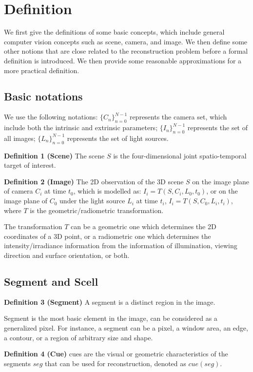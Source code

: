\section{Definition}
\label{sec:3DRecon_Def}
We first give the definitions of some basic concepts, which include general computer vision concepts such as scene, camera, and image. We then define some other notions that are close related to the reconstruction problem before a formal definition is introduced. We then provide some reasonable approximations for a more practical definition.

\subsection{Basic notations}
We use the following notations: $\{C_n\}_{n=0}^{N-1}$ represents the camera set, which include both the intrinsic and extrinsic parameters; $\{I_n\}_{n=0}^{N-1}$ represents the set of all images; $\{L_n\}_{n=0}^{N-1}$ represents the set of light sources.

\textbf{Definition 1 (Scene)} The scene $S$ is the four-dimensional joint spatio-temporal target of interest.

\textbf{Definition 2 (Image)} The 2D observation of the 3D scene $S$ on the image plane of camera $C_i$ at time $t_0$, which is modelled as: $I_i = T(S, C_i, L_0, t_0)$, or on the image plane of $C_0$  under the light source $L_i$ at time $t_i$, $I_i= T(S, C_0, L_i, t_i)$, where $T$ is the geometric/radiometric transformation.

The transformation $T$ can be a geometric one which determines the 2D coordinates of a 3D point, or a radiometric one which determines the intensity/irradiance information from the information of illumination, viewing direction and surface orientation, or both.

\subsection{Segment and Scell}
\textbf{Definition 3 (Segment)} A segment is a distinct region in the image.

Segment is the most basic element in the image, can be considered as a generalized pixel. For instance, a segment can be a pixel, a window area, an edge, a contour, or a region of arbitrary size and shape.

\textbf{Definition 4 (Cue)} cues are the visual or geometric characteristics of the segments $seg$ that can be used for reconstruction, denoted as $cue(seg)$.


